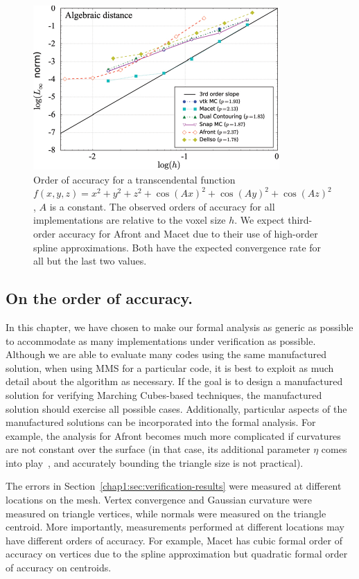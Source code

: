 \begin{figure}[t]
\centering
\includegraphics[width=0.6\linewidth,keepaspectratio=true]{chapter2/figures/afront_meshconv-onh.pdf}
  \caption{Order of accuracy for a transcendental function 
$f(x,y,z) = x^2 + y^2 + z^2 + \cos(Ax)^2 + \cos(Ay)^2 + \cos(Az)^2$, $A$ 
is a constant. The observed orders of accuracy for all implementations 
are relative to the voxel size $h$.
We expect third-order accuracy for 
Afront and Macet due to their use of high-order spline approximations.
Both have the expected convergence rate for all but the last two values.}
  \label{fig:afront-meshconvonh}
\end{figure}


\subsection{On the order of accuracy.}
In this chapter, we have chosen to make our formal analysis as generic
as possible to accommodate as many implementations under verification
as possible. Although we are able to evaluate many codes using the same 
manufactured solution, when using MMS for a particular code, it is best to
exploit as much detail about the algorithm as necessary. If the goal is to 
design a manufactured solution for verifying Marching Cubes-based techniques, 
the manufactured solution should exercise all possible cases. %
Additionally, particular aspects of the manufactured solutions can be
incorporated into the formal analysis. For example, the analysis for
Afront becomes much more complicated if curvatures are not constant
over the surface (in that case, its additional parameter $\eta$ comes
into play~\cite{Schreiner06}, and accurately bounding the triangle
size is not practical).


The errors in Section~\ref{chap1:sec:verification-results} were
measured at different locations on the mesh. Vertex convergence and
Gaussian curvature were measured on triangle vertices, while normals
were measured on the triangle centroid. 
More importantly, measurements
performed at different locations may have different orders of
accuracy. For example,
Macet has cubic formal order of accuracy on vertices due to the spline approximation
but quadratic formal order of accuracy on centroids.

